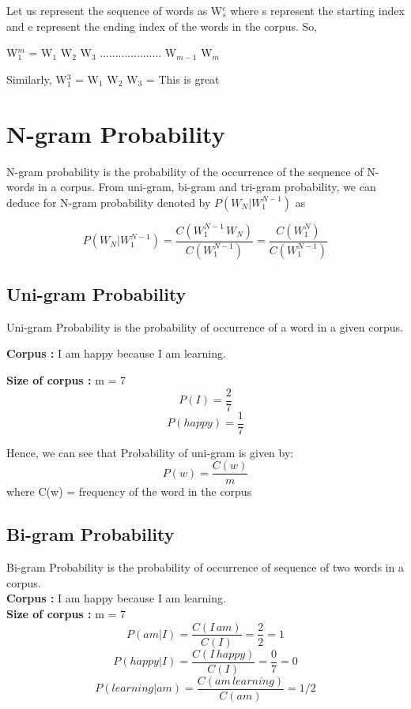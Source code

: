 Let us represent the sequence of words as W$_s^e$ where s represent the starting index and e represent the ending index of the words in the corpus. So,

W$_1^m$ = W$_1$ W$_2$ W$_3$ ....................  W$_{m-1}$ W$_m$

Similarly,  W$_1^3$ = W$_1$ W$_2$ W$_3$ = This is great

\section{N-gram Probability}
N-gram probability is the probability of the occurrence of the sequence of N-words in a corpus. From uni-gram, bi-gram  and tri-gram probability, we can deduce for N-gram probability denoted by $P(W_N | W_1^{N-1})$ as

\begin{equation}
	P(W_N | W_1^{N-1}) = \frac{C(W_1^{N - 1} \, W_N)}{C(W_1^{N - 1})} = \frac{C(W_1^N)}{C(W_1^{N - 1})}
\end{equation}

\subsection{Uni-gram Probability}
Uni-gram Probability is the probability of occurrence of a word in a given corpus.

\textbf{Corpus :} I am happy because I am learning.

\textbf{Size of corpus : } m = 7
\begin{equation}
	P(I) = \frac{2}{7}
\end{equation}
\begin{equation}
	P(happy) = \frac{1}{7}
\end{equation}

Hence, we can see that Probability of uni-gram is given by:
\begin{equation}
	P(w) = \frac{C(w)}{m}
\end{equation}
where C(w) = frequency of the word in the corpus

\subsection{Bi-gram Probability}
Bi-gram Probability is the probability of occurrence of sequence of two words in a corpus.
\\
\textbf{Corpus :} I am happy because I am learning.
\\
\textbf{Size of corpus : } m = 7
\begin{equation}
	P(am | I) = \frac{C(I\, am)}{C(I)} = \frac{2}{2} = 1
\end{equation}
\begin{equation}
	P(happy | I) = \frac{C(I \, happy)}{C(I)}= \frac{0}{7} = 0
\end{equation}
\begin{equation}
	P(learning | am) = \frac{C(am \, learning)}{C(am)} = 1 / 2
\end{equation}

